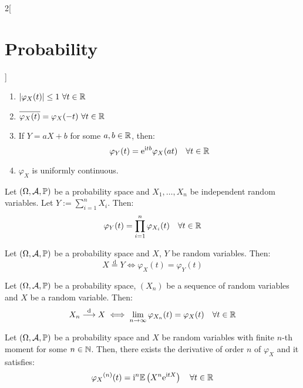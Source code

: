 \documentclass[../../../main.tex]{subfiles}
\begin{document}
\begin{multicols}{2}[\section{Probability}]
\begin{prop}
\begin{enumerate}
      \item $|\varphi_X(t)|\leq 1\ \forall t\in\mathbb{R}$
      \item $\overline{\varphi_X(t)}=\varphi_X(-t)\ \forall t\in\RR$
      \item If $Y=aX+b$ for some $a,b\in \mathbb{R}$, then: $$\varphi_Y(t)=\mathrm{e}^{\mathrm{i} t b}\varphi_X(at)\quad\forall t\in\mathbb{R}$$
      \item $\varphi_X$ is uniformly continuous.
    \end{enumerate}
  \end{prop}
  \begin{theorem}
    Let $(\Omega,\mathcal{A},\mathbb{P})$ be a probability space and $X_1,\ldots,X_n$ be independent random variables. Let $Y:=\sum_{i=1}^n X_i$. Then: $$\varphi_Y(t)=\prod_{i=1}^n\varphi_{X_i}(t)\quad\forall t\in\mathbb{R}$$
  \end{theorem}
  \begin{theorem}
    Let $(\Omega,\mathcal{A},\mathbb{P})$ be a probability space and $X$, $Y$ be random variables. Then: $$X\overset{\text{d}}{=}Y\iff \varphi_X(t)=\varphi_Y(t)$$
  \end{theorem}
  \begin{theorem}
    Let $(\Omega,\mathcal{A},\mathbb{P})$ be a probability space, $(X_n)$ be a sequence of random variables and $X$ be a random variable. Then:
    $$X_n\overset{\text{d}}{\longrightarrow} X\iff\lim_{n\to\infty}\varphi_{X_n}(t)=\varphi_X(t)\quad\forall t\in\mathbb{R}$$
  \end{theorem}
  \begin{prop}
    Let $(\Omega,\mathcal{A},\mathbb{P})$ be a probability space and $X$ be random variables with finite $n$-th moment for some $n\in\mathbb{N}$. Then, there exists the derivative of order $n$ of $\varphi_X$ and it satisfies: $${\varphi_X}^{(n)}(t)=\mathrm{i}^n\mathbb{E}\left(X^n\mathrm{e}^{\mathrm{i} t X}\right)\quad\forall t\in\mathbb{R}$$
  \end{prop}

\end{multicols}
\end{document}
